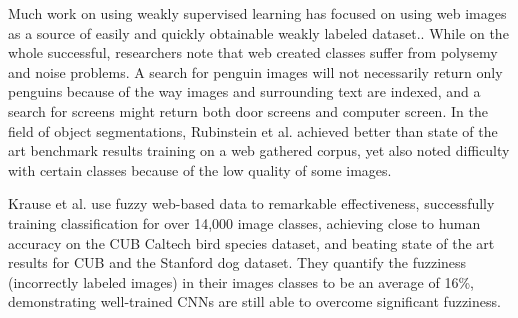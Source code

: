 Much work on using weakly supervised learning has focused on using web images as a source of easily and quickly obtainable weakly labeled dataset.\cite{bergamo2010exploiting}\cite{fergus2010learning}\cite{li2010optimol}\cite{schroff2011harvesting}. While on the whole successful, researchers note that web created classes suffer from polysemy and noise problems. A search for penguin images will not necessarily return only penguins because of the way images and surrounding text are indexed, and a search for screens might return both door screens and computer screen. In the field of object segmentations, Rubinstein et al. achieved better than state of the art benchmark results training on a web gathered corpus, yet also noted difficulty with certain classes because of the low quality of some images.\cite{rubinstein2013unsupervised}

Krause et al. use fuzzy web-based data to remarkable effectiveness, successfully training classification for over 14,000 image classes, achieving close to human accuracy on the CUB Caltech bird species dataset, and beating state of the art results for CUB and the Stanford dog dataset\cite{krause2016unreasonable}. They quantify the fuzziness (incorrectly labeled images) in their images classes to be an average of 16\%, demonstrating well-trained CNNs are still able to overcome significant fuzziness. 

